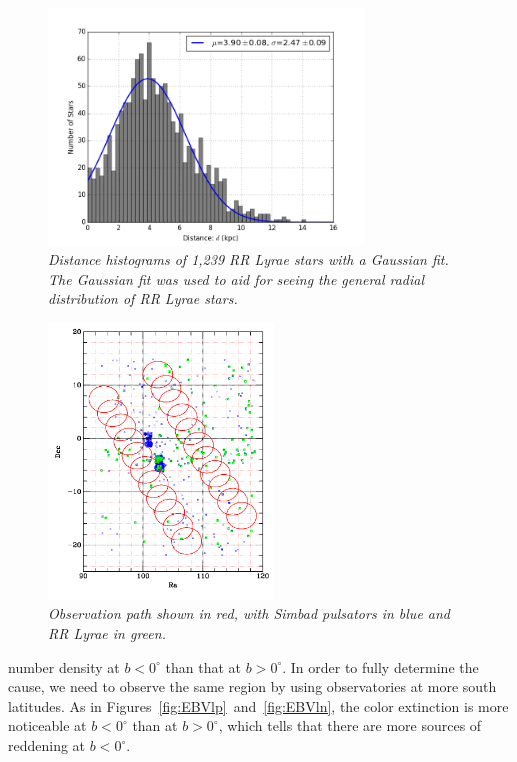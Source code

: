 \documentclass[aps,prb,twocolumn,superscriptaddress]{revtex4-1}
\begin{document}
\begin{figure}[H]
 \centering
 	\includegraphics[width=3.3in]{figures/PlotsSpace15/gdhist_limit15.png}
 \caption{\it \small{Distance histograms of 1,239 RR Lyrae stars with a Gaussian fit. The Gaussian fit was used to aid for seeing the general radial distribution of RR Lyrae stars. }} 
 \label{fig:dhist}
\end{figure} 

\begin{figure}[H]
 \centering
 	\includegraphics[width=2.35in]{figures/simbadoverlap.png}%
 \caption{\it \small{Observation path shown in red, with Simbad pulsators in blue and RR Lyrae in green.}}
 \label{fig:simoverlap}
\end{figure}


\noindent number density at $b<0^{\circ}$ than that at $b>0^{\circ}$. In order to fully determine the cause, we need to observe the same region by using observatories at more south latitudes. As in Figures~\ref{fig:EBVlp}~and~\ref{fig:EBVln}, the color extinction is more noticeable at $b<0^{\circ}$ than at $b>0^{\circ}$, which tells that there are more sources of reddening at $b<0^{\circ}$.
\end{document}
